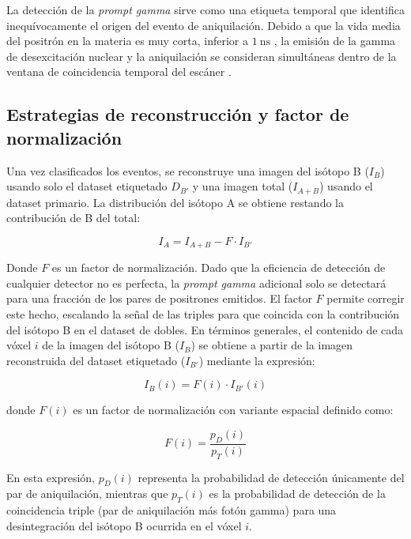 La detección de la \textit{prompt gamma} sirve como una etiqueta temporal que identifica inequívocamente el origen del evento de aniquilación. Debido a que la vida media del positrón en la materia es muy corta, inferior a $\SI{1}{\ns}$ \parencite{Bell1953}, la emisión de la gamma de desexcitación nuclear y la aniquilación se consideran simultáneas dentro de la ventana de coincidencia temporal del escáner \parencite{Andreyev2011}.

\subsection{Estrategias de reconstrucción y factor de normalización}

Una vez clasificados los eventos, se reconstruye una imagen del isótopo B ($I_B$) usando solo el dataset etiquetado $D_{B'}$ y una imagen total ($I_{A+B}$) usando el dataset primario. La distribución del isótopo A se obtiene restando la contribución de B del total:

\begin{equation}
      I_A = I_{A+B} - F \cdot I_{B'}
\end{equation}

Donde $F$ es un factor de normalización. Dado que la eficiencia de detección de cualquier detector no es perfecta, la \textit{prompt gamma} adicional solo se detectará para una fracción de los pares de positrones emitidos. El factor $F$ permite corregir este hecho, escalando la señal de las triples para que coincida con la contribución del isótopo B en el dataset de dobles.
En términos generales, el contenido de cada vóxel $i$ de la imagen del isótopo B ($I_B$) se obtiene a partir de la imagen reconstruida del dataset etiquetado ($I_{B'}$) mediante la expresión:

\begin{equation}
      I_B(i) = F(i) \cdot I_{B'}(i)
\end{equation}

donde $F(i)$ es un factor de normalización con variante espacial definido como:

\begin{equation}
      F(i) = \frac{p_D(i)}{p_T(i)}
\end{equation}

En esta expresión, $p_D(i)$ representa la probabilidad de detección únicamente del par de aniquilación, mientras que $p_T(i)$ es la probabilidad de detección de la coincidencia triple (par de aniquilación más fotón gamma) para una desintegración del isótopo B ocurrida en el vóxel $i$.

